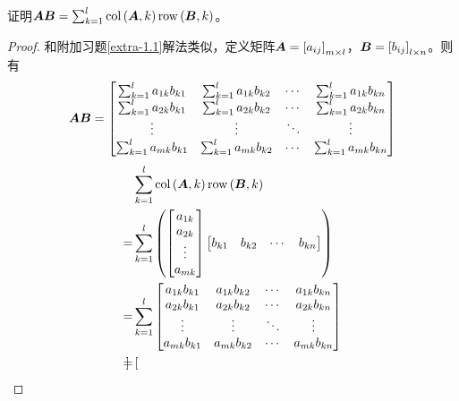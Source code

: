 \begin{extraprob}\label{extra-1.2}
    证明\(\boldsymbol{A}\boldsymbol{B}=\sum_{k=1}^l\mathrm{col}\left( \boldsymbol{A},k \right)\mathrm{row}\left( \boldsymbol{B},k \right)\)。
\end{extraprob}
\begin{proof}
    和附加习题\ref{extra-1.1}解法类似，定义矩阵\(\boldsymbol{A}=\left[ a_{ij} \right]_{m\times l}\)，\(\boldsymbol{B}=\left[ b_{ij} \right]_{l\times n}\)。则有
    \begin{equation*}
        \boldsymbol{A}\boldsymbol{B}=
        \begin{bmatrix}
            \sum_{k=1}^la_{1k}b_{k1} & \sum_{k=1}^la_{1k}b_{k2} & \cdots & \sum_{k=1}^la_{1k}b_{kn} \\
            \sum_{k=1}^la_{2k}b_{k1} & \sum_{k=1}^la_{2k}b_{k2} & \cdots & \sum_{k=1}^la_{2k}b_{kn} \\
            \vdots                   & \vdots                   & \ddots & \vdots                   \\
            \sum_{k=1}^la_{mk}b_{k1} & \sum_{k=1}^la_{mk}b_{k2} & \cdots & \sum_{k=1}^la_{mk}b_{kn}
        \end{bmatrix}
    \end{equation*}
    \begin{align*}
          & \sum_{k=1}^l\mathrm{col}\left( \boldsymbol{A},k \right)\mathrm{row}\left( \boldsymbol{B},k \right)        \\ =&\sum_{k=1}^l
        \left( 
            \begin{bmatrix}
                a_{1k} \\a_{2k}\\\vdots\\a_{mk}
            \end{bmatrix}
            \begin{bmatrix}
                b_{k1} & b_{k2} & \cdots & b_{kn}
            \end{bmatrix}
         \right)                                                   \\
        = & \sum_{k=1}^l
        \begin{bmatrix}
            a_{1k}b_{k1} & a_{1k}b_{k2} & \cdots & a_{1k}b_{kn} \\
            a_{2k}b_{k1} & a_{2k}b_{k2} & \cdots & a_{2k}b_{kn} \\
            \vdots       & \vdots       & \ddots & \vdots       \\
            a_{mk}b_{k1} & a_{mk}b_{k2} & \cdots & a_{mk}b_{kn}
        \end{bmatrix} \\
        = &
        \begin{bmatrix}

\end{bmatrix}
\end{align*}
\end{proof}
